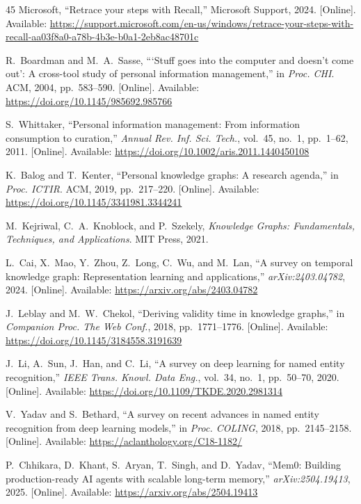 \documentclass[conference]{IEEEtran}
\begin{document}
\begin{thebibliography}{45}
Microsoft, ``Retrace your steps with Recall,'' Microsoft Support, 2024. [Online]. Available: \url{https://support.microsoft.com/en-us/windows/retrace-your-steps-with-recall-aa03f8a0-a78b-4b3e-b0a1-2eb8ac48701c}

R.~Boardman and M.~A.~Sasse, ```Stuff goes into the computer and doesn't come out': A cross-tool study of personal information management,'' in \emph{Proc. CHI}. ACM, 2004, pp.~583--590. [Online]. Available: \url{https://doi.org/10.1145/985692.985766}

S.~Whittaker, ``Personal information management: From information consumption to curation,'' \emph{Annual Rev. Inf. Sci. Tech.}, vol.~45, no.~1, pp.~1--62, 2011. [Online]. Available: \url{https://doi.org/10.1002/aris.2011.1440450108}

K.~Balog and T.~Kenter, ``Personal knowledge graphs: A research agenda,'' in \emph{Proc. ICTIR}. ACM, 2019, pp.~217--220. [Online]. Available: \url{https://doi.org/10.1145/3341981.3344241}

M.~Kejriwal, C.~A.~Knoblock, and P.~Szekely, \emph{Knowledge Graphs: Fundamentals, Techniques, and Applications}. MIT Press, 2021.

L.~Cai, X.~Mao, Y.~Zhou, Z.~Long, C.~Wu, and M.~Lan, ``A survey on temporal knowledge graph: Representation learning and applications,'' \emph{arXiv:2403.04782}, 2024. [Online]. Available: \url{https://arxiv.org/abs/2403.04782}

J.~Leblay and M.~W.~Chekol, ``Deriving validity time in knowledge graphs,'' in \emph{Companion Proc. The Web Conf.}, 2018, pp.~1771--1776. [Online]. Available: \url{https://doi.org/10.1145/3184558.3191639}

J.~Li, A.~Sun, J.~Han, and C.~Li, ``A survey on deep learning for named entity recognition,'' \emph{IEEE Trans. Knowl. Data Eng.}, vol.~34, no.~1, pp.~50--70, 2020. [Online]. Available: \url{https://doi.org/10.1109/TKDE.2020.2981314}

V.~Yadav and S.~Bethard, ``A survey on recent advances in named entity recognition from deep learning models,'' in \emph{Proc. COLING}, 2018, pp.~2145--2158. [Online]. Available: \url{https://aclanthology.org/C18-1182/}

P.~Chhikara, D.~Khant, S.~Aryan, T.~Singh, and D.~Yadav, ``Mem0: Building production-ready AI agents with scalable long-term memory,'' \emph{arXiv:2504.19413}, 2025. [Online]. Available: \url{https://arxiv.org/abs/2504.19413}


\end{thebibliography}
\end{document}
